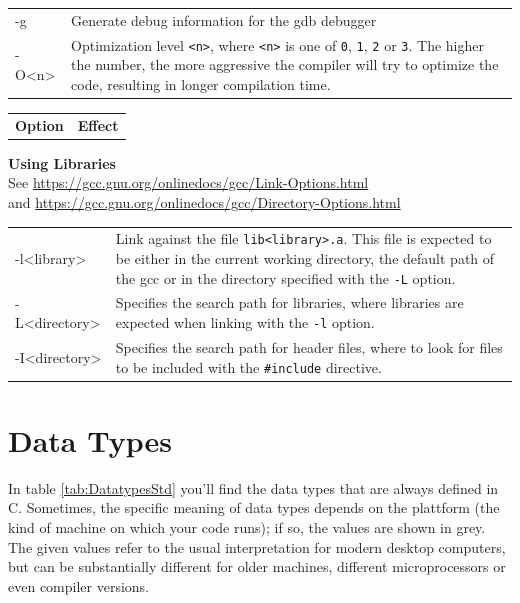 \begin{appendices}
{
\begin{tabularx}
	{\linewidth}
	{OE}
	-g &
	Generate debug information for the gdb debugger
	\\
	
	-O<n> &
	Optimization level \texttt{<n>}, where \texttt{<n>} is one of \texttt{0}, \texttt{1}, \texttt{2} or \texttt{3}.
	The higher the number, the more aggressive the compiler will try to optimize the code, resulting in longer compilation time.
\end{tabularx}

\newpage

\begin{tabularx}
	{\linewidth}
	{OE}

	\normalfont	\bfseries Option &
				\bfseries Effect
	\tabcrlf
\end{tabularx}

\vspace{12pt}
\textbf{Using Libraries} \\
See \url{https://gcc.gnu.org/onlinedocs/gcc/Link-Options.html}\\
and \url{https://gcc.gnu.org/onlinedocs/gcc/Directory-Options.html}

\begin{tabularx}
	{\linewidth}
	{OE}
	-l<library> &
	Link against the file \texttt{lib<library>.a}. This file is expected to be either in the current working directory, the default path of the gcc or in the 
	directory specified with the \texttt{-L} option.
	\\
	
	-L<directory> &
	Specifies the search path for libraries, \ie where libraries are expected when linking with the \texttt{-l} option.
	\\
	
	-I<directory> &
	Specifies the search path for header files, \ie where to look for files to be included with the \texttt{\#include} directive.
	\\
	
	\bottomrule[1.5pt]
\end{tabularx}

\label{tab:CompilerOptions}
}


\section{Data Types} \label{sec:Datatypes}
In table \ref{tab:DatatypesStd} you'll find the data types that are always defined in C. Sometimes, the specific meaning of data types depends on the plattform (\ie the kind of machine on which your code runs); if so, the values are shown in grey. The given values refer to the usual interpretation for modern desktop computers, but can be substantially different for older machines, different microprocessors or even compiler versions.
{

}
\end{appendices}
